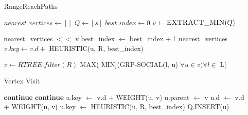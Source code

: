 \begin{algorithm}[t]
\caption{RangeReachPaths}
\begin{scriptsize}
\label{alg3}
\begin{algorithmic}[1]
	\State $nearest\_vertices \gets []$
	\State $Q \gets [s]$
	\State $best\_index \gets 0$
	  \label{alg:theqstart}
		\State $v \gets \Call{EXTRACT\_MIN}{Q}$
		
			\State nearest\_vertices $<<$ v 
			\State best\_index $\gets$ best\_index + 1
				\State \Return nearest\_vertices
			\EndIf
			 
				\State $v.key \gets v.d +$ HEURISTIC(u, R, best\_index)
			\EndFor
		\EndIf
		
			\State {}
		\EndIf
	\EndWhile	\label{alg:theqend}
\EndFunction

	\State $v \gets RTREE.filter(R)$   	
	\State \Return MAX( MIN$_i$(GRP-SOCIAL(l, u) $\forall u \in v) \forall l \in$ L)
\EndFunction

\end{algorithmic}

\end{scriptsize}
\end{algorithm}


\begin{algorithm}[t]
\caption{Vertex Visit}
\begin{scriptsize}
\label{alg4}
\begin{algorithmic}[1]
		 \label{alg:liesin}
			\State \textbf{continue}
		\EndIf
					\State \textbf{continue}
				\Else
					\State u.key $\gets$ v.d + WEIGHT(u, v)
				\EndIf
			\Else
				\State u.parent $\gets$ v
				\State u.d $\gets$ v.d + WEIGHT(u, v)
				\State u.key $\gets$ HEURISTIC(u, R, best\_index)
				\State Q.INSERT(u)
			\EndIf
		\EndIf
	\EndFor
\EndFunction
\end{algorithmic}

\end{scriptsize}
\end{algorithm}

